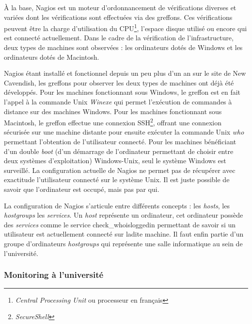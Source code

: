 \vspace{0.20cm}

\`A la base, Nagios est un moteur d'ordonnancement de v\'erifications diverses et vari\'ees dont les v\'erifications sont effectu\'ees via des greffons.
Ces v\'erifications peuvent \^etre la charge d'utilisation du CPU\protect\footnote{\textit{Central Processing Unit} ou processeur en fran\c{c}ais}, l'espace disque utilis\'e ou encore qui est connect\'e actuellement.
Dans le cadre de la v\'erification de l'infrastructure, deux types de machines sont observ\'ees : les ordinateurs dot\'es de Windows et les ordinateurs dot\'es de Macintosh.

Nagios \'etant install\'e et fonctionnel depuis un peu plus d'un an sur le site de New Cavendish, les greffons pour observer les deux types de machines ont d\'ej\`a \'et\'e d\'evelopp\'es.
Pour les machines fonctionnant sous Windows, le greffon est en fait l'appel \`a la commande Unix \textit{Winexe} qui permet l'ex\'ecution de commandes \`a distance sur des machines Windows.
Pour les machines fonctionnant sous Macintosh, le greffon effectue une connexion SSH\protect\footnote{\textit{SecureShell}}, offrant une connexion s\'ecuris\'ee sur une machine distante pour ensuite ex\'ecuter la commande Unix \textit{who} permettant l'obtention de l'utilisateur connect\'e.
Pour les machines b\'en\'eficiant d'un double \textit{boot} (d'un d\'emarrage de l'ordinateur permettant de choisir entre deux syst\`emes d'exploitation) Windows-Unix, seul le syst\`eme Windows est surveill\'e.
La configuration actuelle de Nagios ne permet pas de r\'ecup\'erer avec exactitude l'utilisateur connect\'e sur le syst\`eme Unix.
Il est juste possible de savoir que l'ordinateur est occup\'e, mais pas par qui.

La configuration de Nagios s'articule entre diff\'erents concepts : les \textit{hosts}, les \textit{hostgroups} les \textit{services}.
Un \textit{host} repr\'esente un ordinateur, cet ordinateur poss\`ede des \textit{services} comme le service \textsf{check\_whoisloggedin} permettant de savoir si un utilisateur est actuellement connect\'e sur ladite machine.
Il faut enfin partie d'un groupe d'ordinateurs \textit{hostgroups} qui repr\'esente une salle informatique au sein de l'universit\'e.

\subsubsection{\og{}Monitoring\fg{} \`a l'universit\'e}


